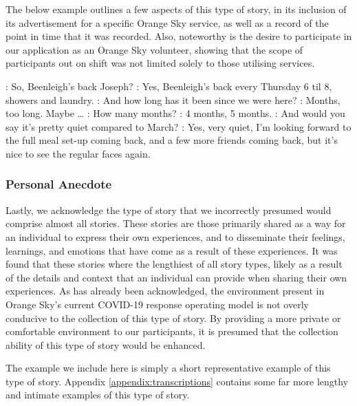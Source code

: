 The below example outlines a few aspects of this type of story, in its inclusion of its advertisement for a specific Orange Sky service, as well as a record of the point in time that it was recorded. Also, noteworthy is the desire to participate in our application as an Orange Sky volunteer, showing that the scope of participants out on shift was not limited solely to those utilising services.

\begin{drama}

    \volaspeaks: So, Beenleigh's back Joseph?
    \volbspeaks: Yes, Beenleigh's back every Thursday 6 til 8, showers and laundry.
    \volaspeaks: And how long has it been since we were here?
    \volbspeaks: Months, too long. Maybe \dots
    \volaspeaks: How many months?
    \volbspeaks: 4 months, 5 months.
    \volaspeaks: And would you say it's pretty quiet compared to March?
    \volbspeaks: Yes, very quiet, I'm looking forward to the full meal set-up coming back, and a few more friends coming back, but it's nice to see the regular faces again.
\end{drama}

\subsubsection{Personal Anecdote}

Lastly, we acknowledge the type of story that we incorrectly presumed would comprise almost all stories. These stories are those primarily shared as a way for an individual to express their own experiences, and to disseminate their feelings, learnings, and emotions that have come as a result of these experiences. It was found that these stories where the lengthiest of all story types, likely as a result of the details and context that an individual can provide when sharing their own experiences. As has already been acknowledged, the environment present in Orange Sky's current COVID-19 response operating model is not overly conducive to the collection of this type of story. By providing a more private or comfortable environment to our participants, it is presumed that the collection ability of this type of story would be enhanced.

The example we include here is simply a short representative example of this type of story. Appendix \ref{appendix:transcriptions} contains some far more lengthy and intimate examples of this type of story.

